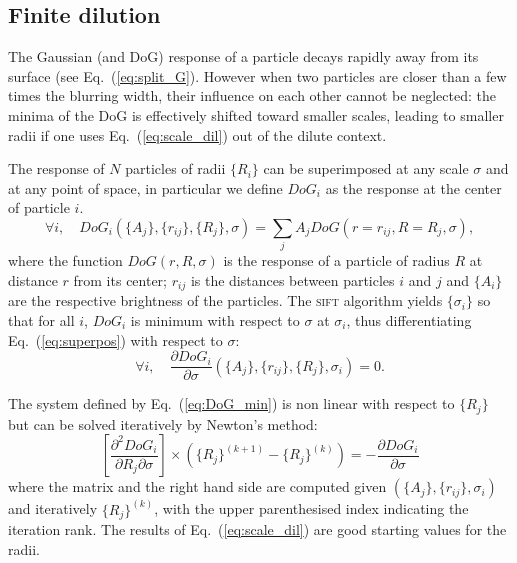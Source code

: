 \subsection*{Finite dilution}
The Gaussian (and DoG) response of a particle decays rapidly away from its surface (see Eq.~(\ref{eq:split_G}). However when two particles are closer than a few times the blurring width, their influence on each other cannot be neglected: the minima of the DoG is effectively shifted toward smaller scales, leading to smaller radii if one uses Eq.~(\ref{eq:scale_dil}) out of the dilute context.

The response of $N$ particles of radii $\lbrace R_i\rbrace$ can be superimposed at any scale $\sigma$ and at any point of space, in particular we define $DoG_i$ as the response at the center of particle $i$.
\begin{equation}
\forall i,\quad DoG_i(\lbrace A_j\rbrace, \lbrace r_{ij}\rbrace, \lbrace R_j\rbrace, \sigma) = \sum_j A_j DoG(r=r_{ij}, R=R_j, \sigma),
\label{eq:superpos}
\end{equation}
where the function $DoG(r,R,\sigma)$ is the response of a particle of radius $R$ at distance $r$ from its center; $r_{ij}$ is the distances between particles $i$ and $j$ and $\lbrace A_i\rbrace$ are the respective brightness of the particles. The \textsc{sift} algorithm yields $\lbrace \sigma_i\rbrace$ so that for all $i$, $DoG_i$ is minimum with respect to $\sigma$ at $\sigma_i$, thus differentiating Eq.~(\ref{eq:superpos}) with respect to $\sigma$:
\begin{equation}
\forall i,\quad \frac{\partial DoG_i}{\partial\sigma}(\lbrace A_j\rbrace, \lbrace r_{ij}\rbrace, \lbrace R_j\rbrace, \sigma_i) = 0.
\label{eq:DoG_min}
\end{equation}

The system defined by Eq.~(\ref{eq:DoG_min}) is non linear with respect to $\lbrace R_j\rbrace$ but can be solved iteratively by Newton's method:
\begin{equation}
\left[ \frac{\partial^2 DoG_i}{\partial R_j\partial\sigma}\right] \times \left( \lbrace R_j\rbrace^{(k+1)} - \lbrace R_j\rbrace^{(k)} \right) = -\frac{\partial DoG_i}{\partial\sigma}
\label{eq:Newton}
\end{equation}
where the matrix and the right hand side are computed given $(\lbrace A_j\rbrace, \lbrace r_{ij}\rbrace, \sigma_i)$ and iteratively $\lbrace R_j\rbrace^{(k)}$, with the upper parenthesised index indicating the iteration rank. The results of Eq.~(\ref{eq:scale_dil}) are good starting values for the radii.

